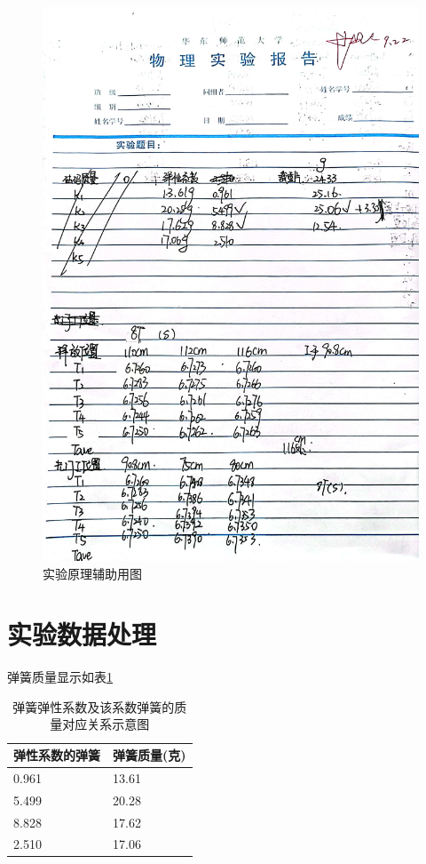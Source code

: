 \documentclass{ctexart}
\begin{document}
\begin{figure}[h]
  \centering
  \includegraphics[height=1\textwidth,width=1\textwidth]{yuanshishujv3.jpg}
  \caption{实验原理辅助用图}\label{yuanshishujv3}
\end{figure}
\newpage

\section{实验数据处理}
弹簧质量显示如表\ref{tanhuangzhiliang}
\begin{table}[h]
  \centering   
  \caption{弹簧弹性系数及该系数弹簧的质量对应关系示意图}\label{tanhuangzhiliang}
  \begin{tabular}{| l || l |}
      \hline
      弹性系数的弹簧 & 弹簧质量(克)\\
      \hline
      0.961 & 13.61 \\
      \hline
      5.499 & 20.28 \\
      \hline
      8.828 & 17.62 \\
      \hline
      2.510 & 17.06 \\
      \hline                       
  \end{tabular}
\end{table}
\end{document}
